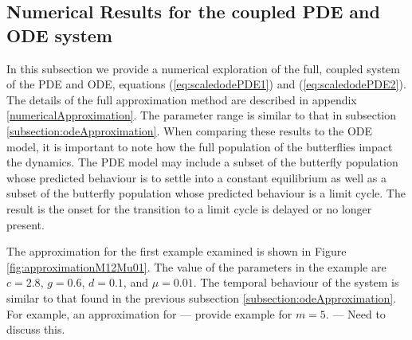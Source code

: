 \documentclass[review,authoryear]{elsarticle}
\begin{document}
\subsection{Numerical Results for the coupled PDE and ODE system}
\label{subsection:pdeApproximation}

In this subsection we provide a  numerical exploration of the full, coupled system of the PDE and
ODE, equations (\ref{eq:scaledodePDE1}) and (\ref{eq:scaledodePDE2}). The details of the full approximation method are
described in appendix \ref{numericalApproximation}. The parameter
range is similar to that in subsection
\ref{subsection:odeApproximation}. When comparing these results to the ODE model, it is important to note how the full population of the butterflies impact the dynamics. The PDE model may include a subset of the butterfly population whose predicted behaviour is to settle into a constant equilibrium as well as a subset of the butterfly population whose predicted behaviour is a limit cycle. The result is the onset for the transition to a limit cycle is delayed or no longer present.

The approximation for the first example examined is shown in Figure \ref{fig:approximationM12Mu01}. 
The value of the parameters in the example are $c=2.8$, $g=0.6$,
$d=0.1$, and $\mu=0.01$. The temporal behaviour of the system is
similar to that found in the previous subsection
\ref{subsection:odeApproximation}. For example, an approximation for
--- provide example for $m=5$. --- Need to discuss this.
\end{document}
